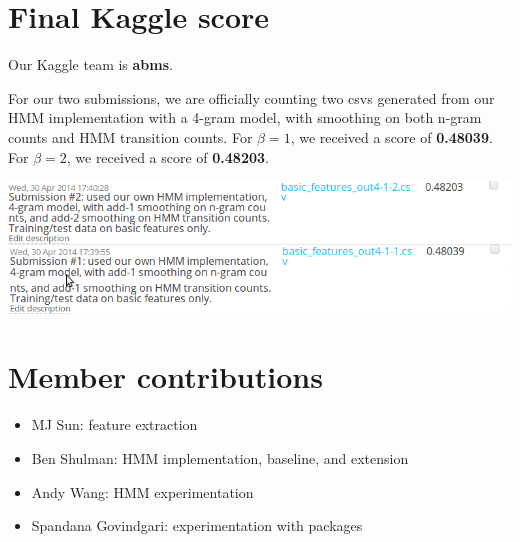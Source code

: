 \documentclass{article}
\begin{document}
\section{Final Kaggle score}
Our Kaggle team is \textbf{abms}.\par
For our two submissions, we are officially counting two csvs generated from our HMM implementation with a 4-gram model, with smoothing on both n-gram counts and HMM transition counts. For $\beta = 1$, we received a score of \textbf{0.48039}. For $\beta = 2$, we received a score of \textbf{0.48203}.\par\medskip

\noindent
\includegraphics[width=\textwidth]{kagglesubs.png}\par\bigskip

\section{Member contributions}
\begin{itemize}[noitemsep]
  \item MJ Sun: feature extraction
  \item Ben Shulman: HMM implementation, baseline, and extension
  \item Andy Wang: HMM experimentation
  \item Spandana Govindgari: experimentation with packages
\end{itemize}
\end{document}
